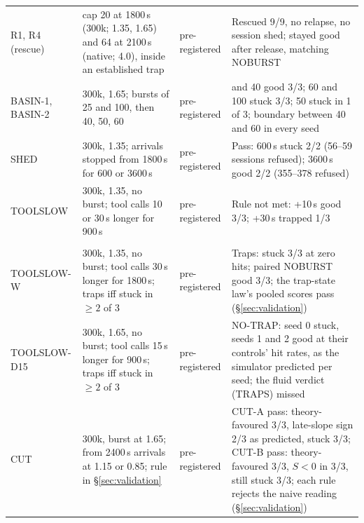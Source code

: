 \begin{table}[t]
\begin{tabular}{@{}>{\raggedright\arraybackslash}p{2.6cm} >{\raggedright\arraybackslash}p{5.0cm} >{\raggedright\arraybackslash}p{1.9cm} >{\raggedright\arraybackslash}p{7.3cm}@{}}
\addlinespace
R1, R4 (rescue) & cap 20 at 1800\,s (300k; 1.35, 1.65) and 64 at 2100\,s (native; 4.0), inside an established trap & pre-registered & Rescued 9/9, no relapse, no session shed; stayed good after release, matching NOBURST\\
BASIN-1, BASIN-2 & 300k, 1.65; bursts of 25 and 100, then 40, 50, 60 & pre-registered & 25 and 40 good 3/3; 60 and 100 stuck 3/3; 50 stuck in 1 of 3; boundary between 40 and 60 in every seed\\
SHED & 300k, 1.35; arrivals stopped from 1800\,s for 600 or 3600\,s & pre-registered & Pass: 600\,s stuck 2/2 (56--59 sessions refused); 3600\,s good 2/2 (355--378 refused)\\
TOOLSLOW & 300k, 1.35, no burst; tool calls 10 or 30\,s longer for 900\,s & pre-registered & Rule not met: +10\,s good 3/3; +30\,s trapped 1/3\\
\addlinespace
\multicolumn{4}{@{}l}{\emph{Registered on 2026-11-05, after Lu et al.\ appeared:}}\\
TOOLSLOW-W & 300k, 1.35, no burst; tool calls 30\,s longer for 1800\,s; traps iff stuck in $\ge2$ of 3 & pre-registered & Traps: stuck 3/3 at zero hits; paired NOBURST good 3/3; the trap-state law's pooled scores pass (\S\ref{sec:validation})\\
TOOLSLOW-D15 & 300k, 1.65, no burst; tool calls 15\,s longer for 900\,s; traps iff stuck in $\ge2$ of 3 & pre-registered & NO-TRAP: seed 0 stuck, seeds 1 and 2 good at their controls' hit rates, as the simulator predicted per seed; the fluid verdict (TRAPS) missed\\
CUT & 300k, burst at 1.65; from 2400\,s arrivals at 1.15 or 0.85; rule in \S\ref{sec:validation} & pre-registered & CUT-A pass: theory-favoured 3/3, late-slope sign 2/3 as predicted, stuck 3/3; CUT-B pass: theory-favoured 3/3, $S<0$ in 3/3, still stuck 3/3; each rule rejects the naive reading (\S\ref{sec:validation})\\
\bottomrule
\end{tabular}
\end{table}

